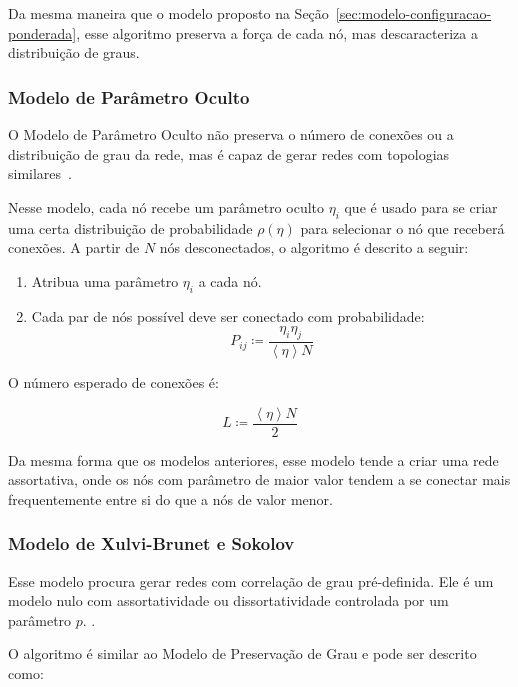 \documentclass[12pt,a4paper]{article}
\theoremstyle{hypo}
\newcommand{\avg}[1]{\left\langle #1 \right\rangle} %
\newcommand{\defn}{\coloneqq} %
\begin{document}
Da mesma maneira que o modelo proposto na Seção~\ref{sec:modelo-configuracao-ponderada}, esse algoritmo preserva a força de cada nó, mas descaracteriza a distribuição de graus.

\subsubsection{Modelo de Parâmetro Oculto}

O Modelo de Parâmetro Oculto não preserva o número de conexões ou a distribuição de grau da rede, mas é capaz de gerar redes com topologias similares~\cite{Barabasi2016-rn}.

Nesse modelo, cada nó recebe um parâmetro oculto $\eta_i$ que é usado para se criar uma certa distribuição de probabilidade $\rho(\eta)$ para selecionar o nó que receberá conexões. A partir de $N$ nós desconectados, o algoritmo é descrito a seguir:

\begin{enumerate}
\item Atribua uma parâmetro $\eta_i$ a cada nó.
\item Cada par de nós possível deve ser conectado com probabilidade:
\begin{equation}
P_{ij} \defn \frac{\eta_i \eta_j}{\avg{\eta}N}
\end{equation}
\end{enumerate}

O número esperado de conexões é:

\begin{equation}
L \defn \frac{\avg{\eta}N}{2} 
\end{equation}

Da mesma forma que os modelos anteriores, esse modelo tende a criar uma rede assortativa, onde os nós com parâmetro de maior valor tendem a se conectar mais frequentemente entre si do que a nós de valor menor.

\subsubsection{Modelo de Xulvi-Brunet e Sokolov}

Esse modelo procura gerar redes com correlação de grau pré-definida. Ele é um modelo nulo com assortatividade ou dissortatividade controlada por um parâmetro $p$. \cite{Xulvi-Brunet2004-qg}.

O algoritmo é similar ao Modelo de Preservação de Grau e pode ser descrito como:
\end{document}
